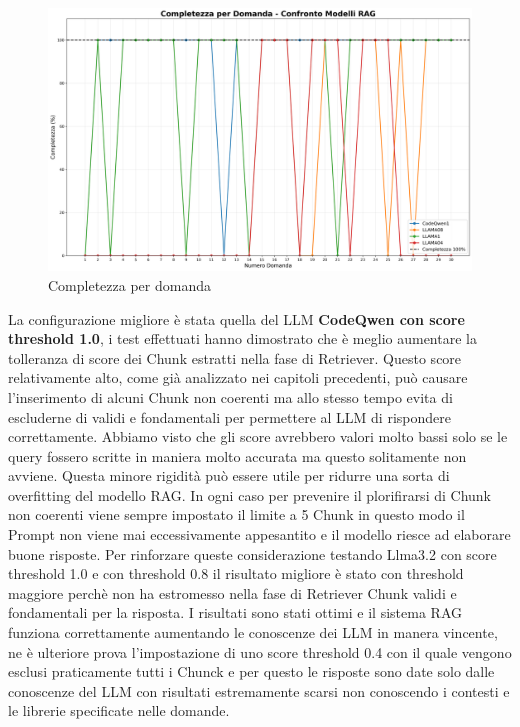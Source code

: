 \documentclass[12pt,a4paper,openright,twoside]{book}
\begin{document}
\begin{figure}[h]
    \centering
    \includegraphics[width=\textwidth]{figures/completezza_per_domanda.png}
    \caption{Completezza per domanda}
    \label{fig:completezza-per-domanda}
\end{figure}
La configurazione migliore è stata quella del LLM \textbf{CodeQwen con score threshold 1.0},
i test effettuati hanno dimostrato che è meglio aumentare la tolleranza di score dei Chunk estratti nella fase di Retriever.
Questo score relativamente alto, come già analizzato nei capitoli precedenti, può causare l'inserimento di alcuni Chunk non coerenti ma allo stesso tempo evita di escluderne di validi e fondamentali per permettere al LLM di rispondere correttamente.
Abbiamo visto che gli score avrebbero valori molto bassi solo se le query fossero scritte in maniera molto accurata ma questo solitamente non avviene.
Questa minore rigidità può essere utile per ridurre una sorta di overfitting del modello RAG.
In ogni caso per prevenire il plorifirarsi di Chunk non coerenti viene sempre impostato il limite a 5 Chunk in questo modo il Prompt non viene mai eccessivamente appesantito e il modello riesce ad elaborare buone risposte.
Per rinforzare queste considerazione testando Llma3.2 con score threshold 1.0 e con threshold 0.8 il risultato migliore è stato con threshold maggiore perchè non ha estromesso nella fase di Retriever Chunk validi e fondamentali per la risposta.
I risultati sono stati ottimi e il sistema RAG funziona correttamente aumentando le conoscenze dei LLM in manera vincente,
ne è ulteriore prova l'impostazione di uno score threshold 0.4 con il quale vengono esclusi praticamente tutti i Chunck e per questo le risposte sono date solo dalle conoscenze del LLM con risultati estremamente scarsi non conoscendo i contesti e le librerie specificate nelle domande.
\end{document}
